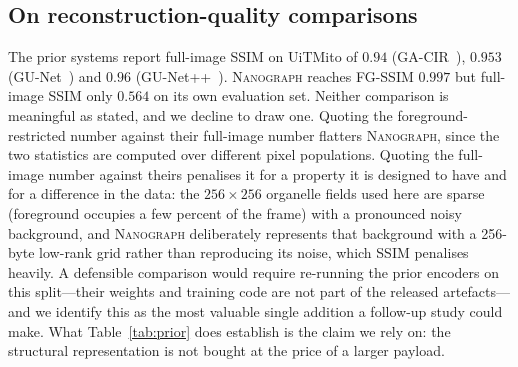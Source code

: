 \documentclass[10pt,a4paper]{article}
\newcommand{\method}{\textnormal{\textsc{Nanograph}}\xspace}
\begin{document}
\subsection{On reconstruction-quality comparisons}
\label{sec:prior-quality}
The prior systems report full-image SSIM on UiTMito of $0.94$
(GA-CIR~\cite{malakar2025eaai}), $0.953$
(GU-Net~\cite{banerjee2023acpr}) and $0.96$
(GU-Net++~\cite{banerjee2024gunetpp}). \method reaches FG-SSIM $0.997$ but
full-image SSIM only $0.564$ on its own evaluation set. Neither comparison
is meaningful as stated, and we decline to draw one. Quoting the
foreground-restricted number against their full-image number flatters
\method, since the two statistics are computed over different pixel
populations. Quoting the full-image number against theirs penalises it for a
property it is designed to have and for a difference in the data: the
$256\times256$ organelle fields used here are sparse (foreground occupies a
few percent of the frame) with a pronounced noisy background, and \method
deliberately represents that background with a 256-byte low-rank grid rather
than reproducing its noise, which SSIM penalises heavily. A defensible
comparison would require re-running the prior encoders on this split---their
weights and training code are not part of the released artefacts---and we
identify this as the most valuable single addition a follow-up study could
make. What Table~\ref{tab:prior} does establish is the claim we rely on: the
structural representation is not bought at the price of a larger payload.

\end{document}
